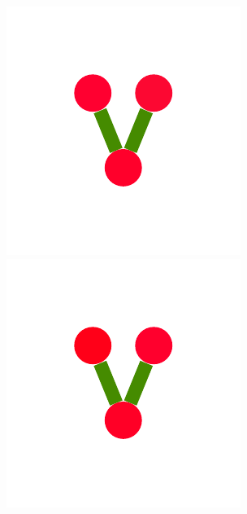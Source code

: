 \documentclass[a4paper,10pt]{article}
\begin{document}
\begin{figure}
{    %
    \includegraphics[scale=.16]{../figures/vector/6-5-tree-induced-8.pdf}
    \includegraphics[scale=.16]{../figures/vector/6-5-tree-induced-9.pdf}
}
\end{figure}
\end{document}
